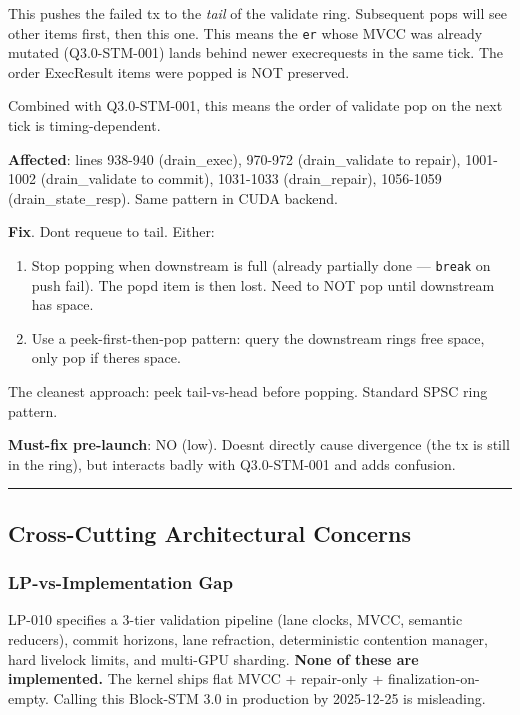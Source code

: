 \documentclass[
]{article}
\providecommand{\tightlist}{%
  \setlength{\itemsep}{0pt}\setlength{\parskip}{0pt}}
\begin{document}
This pushes the failed tx to the \emph{tail} of the validate ring.
Subsequent pops will see other items first, then this one. This means
the \texttt{er} whose MVCC was already mutated (Q3.0-STM-001) lands
behind newer execrequests in the same tick. The order ExecResult items
were popped is NOT preserved.

Combined with Q3.0-STM-001, this means the order of validate pop on the
next tick is timing-dependent.

\textbf{Affected}: lines 938-940 (drain\_exec), 970-972 (drain\_validate
to repair), 1001-1002 (drain\_validate to commit), 1031-1033
(drain\_repair), 1056-1059 (drain\_state\_resp). Same pattern in CUDA
backend.

\textbf{Fix}. Don\textquotesingle t requeue to tail. Either:

\begin{enumerate}
\def\labelenumi{\arabic{enumi}.}
\tightlist
\item
  Stop popping when downstream is full (already partially done ---
  \texttt{break} on push fail). The pop\textquotesingle d item is then
  lost. Need to NOT pop until downstream has space.
\item
  Use a peek-first-then-pop pattern: query the downstream
  ring\textquotesingle s free space, only pop if there\textquotesingle s
  space.
\end{enumerate}

The cleanest approach: peek tail-vs-head before popping. Standard SPSC
ring pattern.

\textbf{Must-fix pre-launch}: NO (low). Doesn\textquotesingle t directly
cause divergence (the tx is still in the ring), but interacts badly with
Q3.0-STM-001 and adds confusion.

\begin{center}\rule{0.5\linewidth}{0.5pt}\end{center}

\subsection{Cross-Cutting Architectural
Concerns}\label{cross-cutting-architectural-concerns}

\subsubsection{LP-vs-Implementation Gap}\label{lp-vs-implementation-gap}

LP-010 specifies a 3-tier validation pipeline (lane clocks, MVCC,
semantic reducers), commit horizons, lane refraction, deterministic
contention manager, hard livelock limits, and multi-GPU sharding.
\textbf{None of these are implemented.} The kernel ships flat MVCC +
repair-only + finalization-on-empty. Calling this Block-STM 3.0 in
production by 2025-12-25 is misleading.
\end{document}
